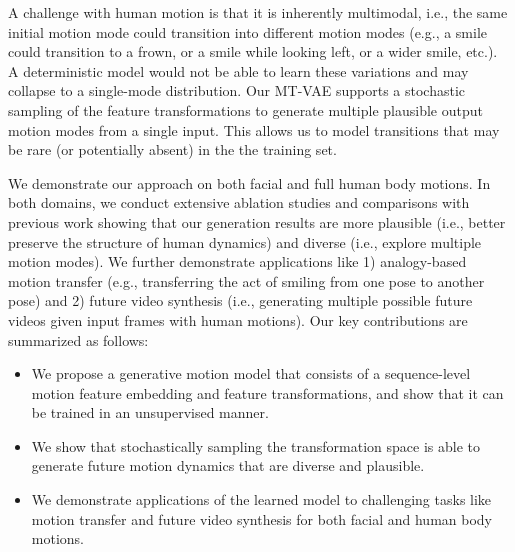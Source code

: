 \documentclass[runningheads]{llncs}
\newcommand{\cutsectionup}{\vspace*{-0.2in}}
\begin{document}
A challenge with human motion is that it is inherently multimodal, i.e., the same initial motion mode could transition into different motion modes (e.g., a smile could transition to a frown, or a smile while looking left, or a wider smile, etc.).
A deterministic model would not be able to learn these variations and may collapse to a single-mode distribution.
Our MT-VAE supports a stochastic sampling of the feature transformations to generate multiple plausible output motion modes from a single input.
This allows us to model transitions that may be rare (or potentially absent) in the the training set.

We demonstrate our approach on both facial and full human body motions. 
In both domains, we conduct extensive ablation studies and comparisons with previous work showing that our generation results are more plausible (i.e., better preserve the structure of human dynamics) and diverse (i.e., explore multiple motion modes).
We further demonstrate applications like 
1) analogy-based motion transfer
(e.g., transferring the act of smiling from one pose to another pose)
and 
2) future video synthesis (i.e., generating multiple possible future videos given input frames with human motions). 
Our key contributions are summarized as follows:
\vspace{-0.05in}
\begin{itemize}
    \item We propose a generative motion model that consists of a sequence-level motion feature embedding and feature transformations, and show that it can be trained in an unsupervised manner.
    \item We show that stochastically sampling the transformation space is able to generate future motion dynamics that are diverse and plausible.
    \item We demonstrate applications of the learned model to challenging tasks like motion transfer and future video synthesis for both facial and human body motions.
\vspace*{-0.1in}
\end{itemize}

\cutsectionup
\end{document}
